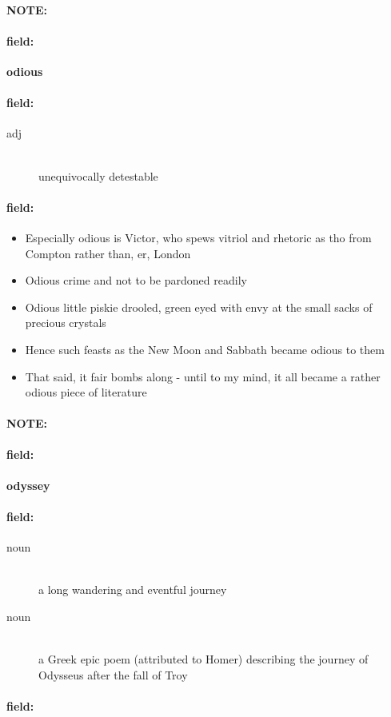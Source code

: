 \documentclass[12pt]{article}
\newenvironment{note}{\paragraph{NOTE:}}{}
\newenvironment{field}{\paragraph{field:}}{}
\begin{document}
\begin{note}
\begin{field}
\textbf{\large odious}
\end{field}


\begin{field}
\begin{description}
\item[adj] \hfill \\ 
unequivocally detestable

\end{description}
\end{field}

\begin{field}
\begin{itemize}
\item Especially odious is Victor, who spews vitriol and rhetoric as tho from Compton rather than, er, London
\item Odious crime and not to be pardoned readily
\item Odious little piskie drooled, green eyed with envy at the small sacks of precious crystals
\item Hence such feasts as the New Moon and Sabbath became odious to them
\item That said, it fair bombs along - until to my mind, it all became a rather odious piece of literature
\end{itemize}
\end{field}
\end{note}
\begin{note}
\begin{field}
\textbf{\large odyssey}
\end{field}


\begin{field}
\begin{description}
\item[noun] \hfill \\ 
a long wandering and eventful journey

\item[noun] \hfill \\ 
a Greek epic poem (attributed to Homer) describing the journey of Odysseus after the fall of Troy

\end{description}
\end{field}

\begin{field}
\end{field}
\end{note}
\end{document}
